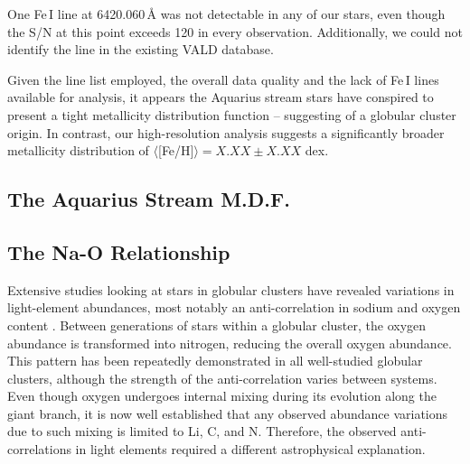 \documentclass{emulateapj}
\begin{document}
One Fe\,I line at 6420.060\,\AA{} was not detectable in any of our stars, even though the S/N at this point exceeds 120 in every observation. Additionally, we could not identify the line in the existing VALD database.



Given the line list employed, the overall data quality and the lack of Fe\,I lines available for analysis, it appears the Aquarius stream stars have conspired to present a tight metallicity distribution function -- suggesting of a globular cluster origin. In contrast, our high-resolution analysis suggests a significantly broader metallicity distribution of $\langle$[Fe/H]$\rangle = X.XX \pm X.XX$ dex.

\subsection{The Aquarius Stream M.D.F.}

\subsection{The Na-O Relationship}



Extensive studies looking at stars in globular clusters have revealed variations in light-element abundances, most notably an anti-correlation in sodium and oxygen content \citet{Norris;Da-Costa_1995}. Between generations of stars within a globular cluster, the oxygen abundance is transformed into nitrogen, reducing the overall oxygen abundance. 
This pattern has been repeatedly demonstrated in all well-studied globular clusters, although the strength of the anti-correlation varies between systems. Even though oxygen undergoes internal mixing during its evolution along the giant branch, it is now well established that any observed abundance variations due to such mixing is limited to Li, C, and N. Therefore, the observed anti-correlations in light elements required a different astrophysical explanation.
\end{document}
